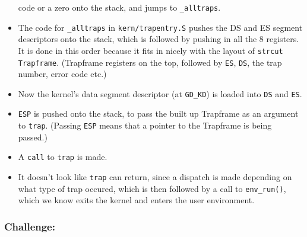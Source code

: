 \documentclass[]{article}
\begin{document}
\begin{itemize}
  code or a zero onto the stack, and jumps to \texttt{\_alltraps}.
\item
  The code for \texttt{\_alltraps} in \texttt{kern/trapentry.S} pushes
  the DS and ES segment descriptors onto the stack, which is followed by
  pushing in all the 8 registers. It is done in this order because it
  fits in nicely with the layout of \texttt{strcut Trapframe}.
  (Trapframe registers on the top, followed by \texttt{ES}, \texttt{DS},
  the trap number, error code etc.)
\item
  Now the kernel's data segment descriptor (at \texttt{GD\_KD}) is
  loaded into \texttt{DS} and \texttt{ES}.
\item
  \texttt{ESP} is pushed onto the stack, to pass the built up Trapframe
  as an argument to \texttt{trap}. (Passing \texttt{ESP} means that a
  pointer to the Trapframe is being passed.)
\item
  A \texttt{call} to \texttt{trap} is made.
\item
  It doesn't look like \texttt{trap} can return, since a dispatch is
  made depending on what type of trap occured, which is then followed by
  a call to \texttt{env\_run()}, which we know exits the kernel and
  enters the user environment.
\end{itemize}

\subsubsection{Challenge:}
\end{document}
